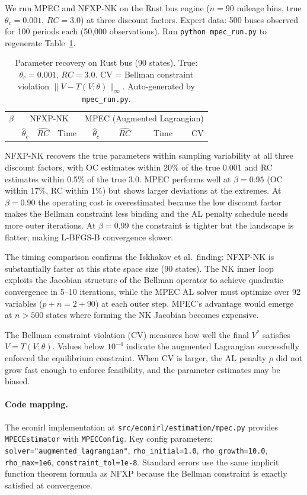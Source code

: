 \documentclass[11pt]{article}
\begin{document}
We run MPEC and NFXP-NK on the Rust bus engine ($n = 90$ mileage bins, true $\theta_c = 0.001$, $RC = 3.0$) at three discount factors.
Expert data: 500 buses observed for 100 periods each (50,000 observations).
Run \texttt{python mpec\_run.py} to regenerate Table~\ref{tab:results}.

\begin{table}[h!]
\centering\small
\begin{tabular}{r|rrr|rrrr}
\toprule
$\beta$ & \multicolumn{3}{c|}{NFXP-NK} & \multicolumn{4}{c}{MPEC (Augmented Lagrangian)} \\
 & $\hat\theta_c$ & $\widehat{RC}$ & Time & $\hat\theta_c$ & $\widehat{RC}$ & Time & CV \\
\midrule

\bottomrule
\end{tabular}
\caption{Parameter recovery on Rust bus (90 states). True: $\theta_c = 0.001$, $RC = 3.0$. CV = Bellman constraint violation $\|V - T(V;\theta)\|_\infty$. Auto-generated by \texttt{mpec\_run.py}.}
\label{tab:results}
\end{table}
\FloatBarrier

NFXP-NK recovers the true parameters within sampling variability at all three discount factors, with OC estimates within 20\% of the true 0.001 and RC estimates within 0.5\% of the true 3.0.
MPEC performs well at $\beta = 0.95$ (OC within 17\%, RC within 1\%) but shows larger deviations at the extremes.
At $\beta = 0.90$ the operating cost is overestimated because the low discount factor makes the Bellman constraint less binding and the AL penalty schedule needs more outer iterations.
At $\beta = 0.99$ the constraint is tighter but the landscape is flatter, making L-BFGS-B convergence slower.

The timing comparison confirms the Iskhakov et al.\ finding: NFXP-NK is substantially faster at this state space size (90 states).
The NK inner loop exploits the Jacobian structure of the Bellman operator to achieve quadratic convergence in 5--10 iterations, while the MPEC AL solver must optimize over 92 variables ($p + n = 2 + 90$) at each outer step.
MPEC's advantage would emerge at $n > 500$ states where forming the NK Jacobian becomes expensive.

The Bellman constraint violation (CV) measures how well the final $V^*$ satisfies $V = T(V;\theta)$.
Values below $10^{-4}$ indicate the augmented Lagrangian successfully enforced the equilibrium constraint.
When CV is larger, the AL penalty $\rho$ did not grow fast enough to enforce feasibility, and the parameter estimates may be biased.

\paragraph{Code mapping.}
The econirl implementation at \texttt{src/econirl/estimation/mpec.py} provides \texttt{MPECEstimator} with \texttt{MPECConfig}.
Key config parameters: \texttt{solver="augmented\_lagrangian"}, \texttt{rho\_initial=1.0}, \texttt{rho\_growth=10.0}, \texttt{rho\_max=1e6}, \texttt{constraint\_tol=1e-8}.
Standard errors use the same implicit function theorem formula as NFXP because the Bellman constraint is exactly satisfied at convergence.


\end{document}
